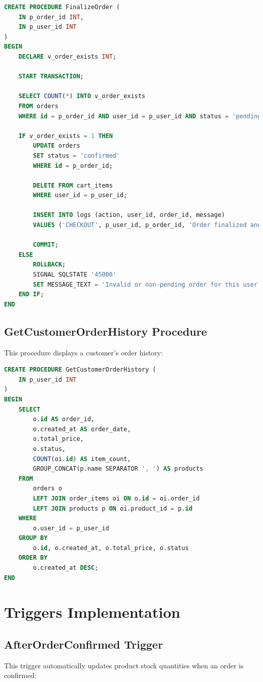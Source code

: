 \documentclass[14pt,a4paper]{article}
\begin{document}
\begin{lstlisting}[language=SQL]
CREATE PROCEDURE FinalizeOrder (
    IN p_order_id INT,
    IN p_user_id INT
)
BEGIN
    DECLARE v_order_exists INT;

    START TRANSACTION;

    SELECT COUNT(*) INTO v_order_exists
    FROM orders
    WHERE id = p_order_id AND user_id = p_user_id AND status = 'pending';

    IF v_order_exists = 1 THEN
        UPDATE orders
        SET status = 'confirmed'
        WHERE id = p_order_id;

        DELETE FROM cart_items
        WHERE user_id = p_user_id;

        INSERT INTO logs (action, user_id, order_id, message)
        VALUES ('CHECKOUT', p_user_id, p_order_id, 'Order finalized and cart emptied');

        COMMIT;
    ELSE
        ROLLBACK;
        SIGNAL SQLSTATE '45000'
        SET MESSAGE_TEXT = 'Invalid or non-pending order for this user';
    END IF;
END
\end{lstlisting}

\subsection{GetCustomerOrderHistory Procedure}
This procedure displays a customer's order history:

\begin{lstlisting}[language=SQL]
CREATE PROCEDURE GetCustomerOrderHistory (
    IN p_user_id INT
)
BEGIN
    SELECT
        o.id AS order_id,
        o.created_at AS order_date,
        o.total_price,
        o.status,
        COUNT(oi.id) AS item_count,
        GROUP_CONCAT(p.name SEPARATOR ', ') AS products
    FROM
        orders o
        LEFT JOIN order_items oi ON o.id = oi.order_id
        LEFT JOIN products p ON oi.product_id = p.id
    WHERE
        o.user_id = p_user_id
    GROUP BY
        o.id, o.created_at, o.total_price, o.status
    ORDER BY
        o.created_at DESC;
END
\end{lstlisting}

\section{Triggers Implementation}

\subsection{AfterOrderConfirmed Trigger}
This trigger automatically updates product stock quantities when an order is confirmed:
\end{document}
